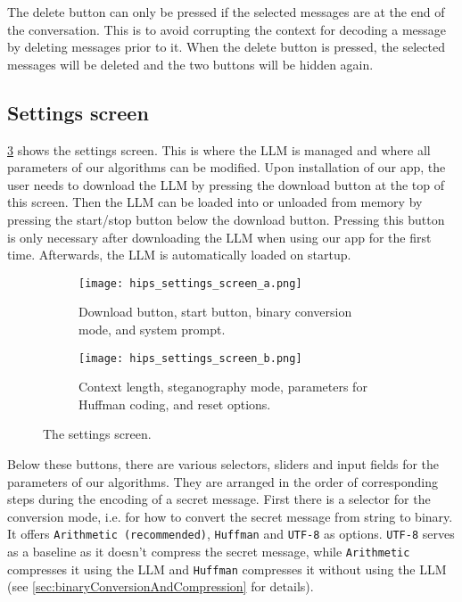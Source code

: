 The delete button can only be pressed if the selected messages are at the end of the conversation. This is to avoid corrupting the context for decoding a message by deleting messages prior to it. When the delete button is pressed, the selected messages will be deleted and the two buttons will be hidden again.

\subsection{Settings screen}
\label{sec:settingsScreen}
\cref{fig:settingsScreen} shows the settings screen. This is where the \gls{LLM} is managed and where all parameters of our algorithms can be modified. Upon installation of our app, the user needs to download the \gls{LLM} by pressing the download button at the top of this screen. Then the \gls{LLM} can be loaded into or unloaded from memory by pressing the start/stop button below the download button. Pressing this button is only necessary after downloading the \gls{LLM} when using our app for the first time. Afterwards, the \gls{LLM} is automatically loaded on startup.

\begin{figure}
	\begin{wide}
		\captionsetup{width=\linewidth}
		\begin{subfigure}{0.45\linewidth}
			\centering
			\texttt{[image: hips\_settings\_screen\_a.png]}
			\caption{Download button, start button, binary conversion mode, and system prompt.}
			\label{fig:settingsScreenA}
		\end{subfigure}
        \hfill
        \begin{subfigure}{0.45\linewidth}
			\centering
			\texttt{[image: hips\_settings\_screen\_b.png]}
			\caption{Context length, steganography mode, parameters for Huffman coding, and reset options.}
			\label{fig:settingsScreenB}
		\end{subfigure}
		\caption[HiPS: Settings screen]{The settings screen.}
		\label{fig:settingsScreen}
	\end{wide}
\end{figure}

Below these buttons, there are various selectors, sliders and input fields for the parameters of our algorithms. They are arranged in the order of corresponding steps during the encoding of a secret message. First there is a selector for the conversion mode, i.e. for how to convert the secret message from string to binary. It offers \lstinline|Arithmetic (recommended)|, \lstinline|Huffman| and \lstinline|UTF-8| as options. \lstinline|UTF-8| serves as a baseline as it doesn't compress the secret message, while \lstinline|Arithmetic| compresses it using the \gls{LLM} and \lstinline|Huffman| compresses it without using the \gls{LLM} (see \cref{sec:binaryConversionAndCompression} for details).

